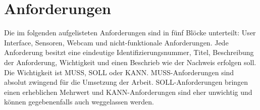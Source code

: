 \chapter{Anforderungen}
Die im folgenden aufgelisteten Anforderungen sind in fünf Blöcke unterteilt: User Interface, Sensoren, Webcam und nicht-funktionale Anforderungen.
Jede Anforderung besitzt eine eindeutige Identifizierungsnummer, Titel, Beschreibung der Anforderung, Wichtigkeit und einen Beschrieb wie der Nachweis erfolgen soll.
Die Wichtigkeit ist MUSS, SOLL oder KANN. MUSS-Anforderungen sind absolut zwingend für die Umsetzung der Arbeit. SOLL-Anforderungen bringen einen erheblichen Mehrwert und KANN-Anforderungen sind eher unwichtig und können gegebenenfalls auch weggelassen werden.

